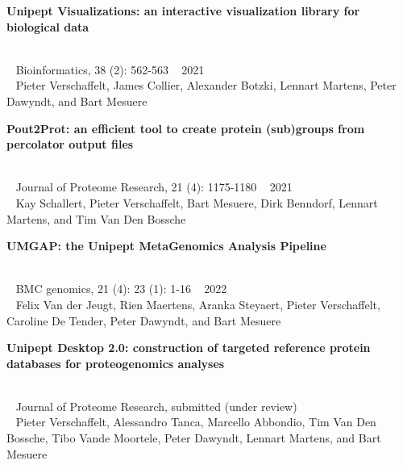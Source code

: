 \begin{large}\textbf{\textsf{Unipept Visualizations: an interactive visualization library for biological data}}\end{large} \\
\faBook ~ \textsf{Bioinformatics, 38 (2): 562-563} \hfill \faCalendar ~ \textsf{2021} \\
{
    \myriad
    \faUser ~ \textsf{Pieter Verschaffelt}, James Collier, Alexander Botzki, Lennart Martens, Peter Dawyndt, and Bart Mesuere \\
}

\begin{large}\textbf{\textsf{Pout2Prot: an efficient tool to create protein (sub)groups from percolator output files}}\end{large} \\
\faBook ~ \textsf{Journal of Proteome Research, 21 (4): 1175-1180} \hfill \faCalendar ~ \textsf{2021} \\
{
    \myriad
    \faUser ~ Kay Schallert, \textsf{Pieter Verschaffelt}, Bart Mesuere, Dirk Benndorf, Lennart Martens, and Tim Van Den Bossche \\
}

\begin{large}\textbf{\textsf{UMGAP: the Unipept MetaGenomics Analysis Pipeline}}\end{large} \\
\faBook ~ \textsf{BMC genomics, 21 (4): 23 (1): 1-16} \hfill \faCalendar ~ \textsf{2022} \\
{
    \myriad
    \faUser ~ Felix Van der Jeugt, Rien Maertens, Aranka Steyaert, \textsf{Pieter Verschaffelt}, Caroline De Tender, Peter Dawyndt, and Bart Mesuere \\
}

\begin{large}\textbf{\textsf{Unipept Desktop 2.0: construction of targeted reference protein databases for proteogenomics analyses}}\end{large} \\
\faBook ~ \textsf{Journal of Proteome Research, submitted (under review)} \\
{
    \myriad
    \faUser ~ \textsf{Pieter Verschaffelt}, Alessandro Tanca, Marcello Abbondio, Tim Van Den Bossche, Tibo Vande Moortele, Peter Dawyndt, Lennart Martens, and Bart Mesuere \\
}
